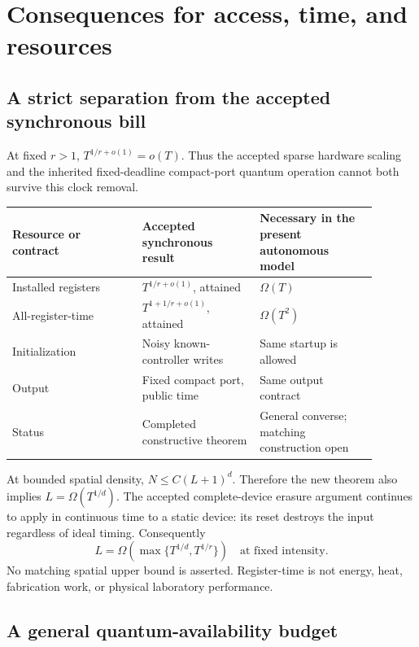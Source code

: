 \documentclass[11pt]{article}
\begin{document}
\section{Consequences for access, time, and resources}

\subsection{A strict separation from the accepted synchronous bill}

At fixed \(r>1\), \(T^{1/r+o(1)}=o(T)\). Thus the accepted sparse
hardware scaling and the inherited fixed-deadline compact-port
quantum operation cannot both survive this clock removal.

\begin{center}
\small
\begin{tabular}{p{0.31\linewidth}p{0.29\linewidth}p{0.29\linewidth}}
\toprule
Resource or contract & Accepted synchronous result & Necessary in the present autonomous model\\
\midrule
Installed registers & \(T^{1/r+o(1)}\), attained & \(\Omega(T)\)\\
All-register-time & \(T^{1+1/r+o(1)}\), attained & \(\Omega(T^2)\)\\
Initialization & Noisy known-controller writes & Same startup is allowed\\
Output & Fixed compact port, public time & Same output contract\\
Status & Completed constructive theorem & General converse; matching construction open\\
\bottomrule
\end{tabular}
\end{center}

At bounded spatial density, \(N\leq C(L+1)^d\). Therefore the new theorem
also implies \(L=\Omega(T^{1/d})\). The accepted complete-device
erasure argument continues to apply in continuous time to a static
device: its reset destroys the input regardless of ideal timing.
Consequently
\[
 L=\Omega\!\left(\max\{T^{1/d},T^{1/r}\}\right)
 \quad\text{at fixed intensity.}
 \tag{28}
\]
No matching spatial upper bound is asserted. Register-time is not energy,
heat, fabrication work, or physical laboratory performance.

\subsection{A general quantum-availability budget}
\end{document}
